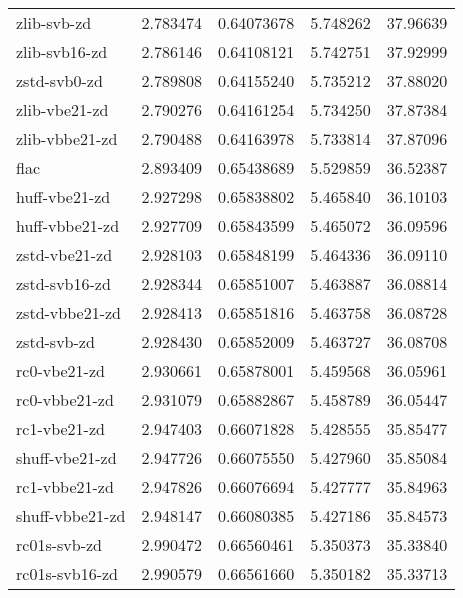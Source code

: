 \begin{table}
\begin{tabular}{|l|l|l|l|l|}
        zlib-svb-zd    &2.783474  & 0.64073678 & 5.748262 & 37.96639\\
      zlib-svb16-zd    &2.786146  & 0.64108121 & 5.742751 & 37.92999\\
    zstd-svb0-zd    &2.789808  & 0.64155240 & 5.735212 & 37.88020\\
      zlib-vbe21-zd    &2.790276  & 0.64161254 & 5.734250 & 37.87384\\
     zlib-vbbe21-zd    &2.790488  & 0.64163978 & 5.733814 & 37.87096\\
           flac    &2.893409  & 0.65438689 & 5.529859 & 36.52387\\
      huff-vbe21-zd    &2.927298  & 0.65838802 & 5.465840 & 36.10103\\
     huff-vbbe21-zd    &2.927709  & 0.65843599 & 5.465072 & 36.09596\\
      zstd-vbe21-zd    &2.928103  & 0.65848199 & 5.464336 & 36.09110\\
      zstd-svb16-zd    &2.928344  & 0.65851007 & 5.463887 & 36.08814\\
     zstd-vbbe21-zd    &2.928413  & 0.65851816 & 5.463758 & 36.08728\\
		\rowcolor{gray}
        zstd-svb-zd    &2.928430  & 0.65852009 & 5.463727 & 36.08708\\
		\rowcolor{lightgray}
       rc0-vbe21-zd    &2.930661  & 0.65878001 & 5.459568 & 36.05961\\
		\rowcolor{lightgray}
      rc0-vbbe21-zd    &2.931079  & 0.65882867 & 5.458789 & 36.05447\\
		\rowcolor{lightgray}
       rc1-vbe21-zd    &2.947403  & 0.66071828 & 5.428555 & 35.85477\\
		\rowcolor{lightgray}
     shuff-vbe21-zd    &2.947726  & 0.66075550 & 5.427960 & 35.85084\\
		\rowcolor{lightgray}
      rc1-vbbe21-zd    &2.947826  & 0.66076694 & 5.427777 & 35.84963\\
		\rowcolor{lightgray}
    shuff-vbbe21-zd    &2.948147  & 0.66080385 & 5.427186 & 35.84573\\
	       \hline
		\rowcolor{lightgray}
       rc01s-svb-zd    &2.990472  & 0.66560461 & 5.350373 & 35.33840\\
		\rowcolor{lightgray}
     rc01s-svb16-zd    &2.990579  & 0.66561660 & 5.350182 & 35.33713\\

\end{tabular}
\end{table}

